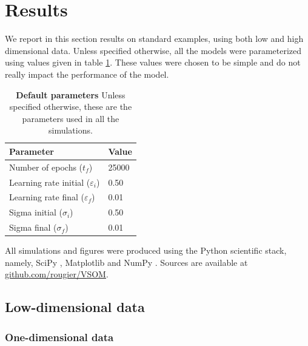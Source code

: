\section{Results}

We report in this section results on standard examples, using both low and high
dimensional data. Unless specified otherwise, all the models were parameterized
using values given in table \ref{table:parameters}. These values were chosen to
be simple and do not really impact the performance of the model.
\begin{table}[!ht]
  \begin{center}
    \begin{tabular}{ll}
        \textbf{Parameter} & \textbf{Value} \\
        \hline
        Number of epochs      ($t_f$)           & 25000\\
        Learning rate initial ($\varepsilon_i$) & 0.50\\
        Learning rate final   ($\varepsilon_f$) & 0.01\\
        Sigma initial         ($\sigma_i$)      & 0.50\\
        Sigma final           ($\sigma_f$)      & 0.01\\
    \end{tabular}
      \caption{\textbf{Default parameters} Unless specified otherwise, these are
        the parameters used in all the simulations.}
      \label{table:parameters}
  \end{center}
\end{table}
All simulations and figures were produced using the Python scientific stack,
namely, SciPy \citep{Jones:2001}, Matplotlib \citep{Hunter:2007} and
NumPy \citep{Walt:2011}. Sources are available at
\href{https://github.com/rougier/VSOM}{github.com/rougier/VSOM}.\\


\subsection{Low-dimensional data}

\subsubsection{One-dimensional data}

